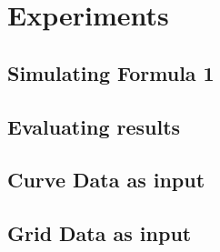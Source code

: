 \section{Experiments}

\subsection{Simulating Formula 1}



\subsection{Evaluating results}

\subsection{Curve Data as input}

\subsection{Grid Data as input}
 